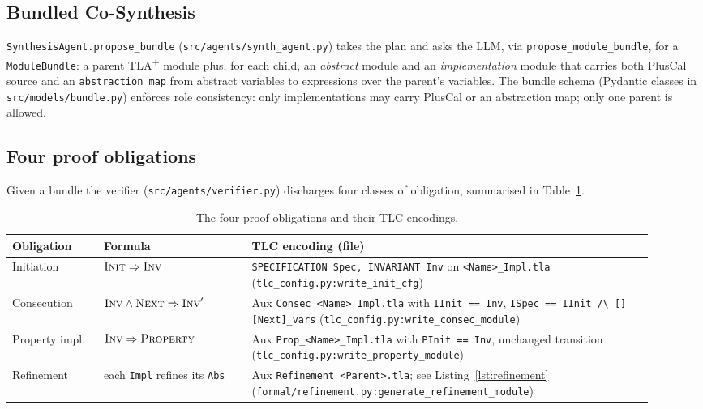 \documentclass[11pt]{article}
\newcommand{\impl}{\Rightarrow}
\newcommand{\TLA}{TLA\textsuperscript{+}}
\newcommand{\nxt}{\textsc{Next}}
\newcommand{\inv}{\textsc{Inv}}
\newcommand{\initp}{\textsc{Init}}
\newcommand{\prop}{\textsc{Property}}
\begin{document}
\subsection{Bundled Co-Synthesis}
\texttt{SynthesisAgent.propose\_bundle} (\texttt{src/agents/synth\_agent.py})
takes the plan and asks the LLM, via \texttt{propose\_module\_bundle}, for a
\texttt{ModuleBundle}: a parent \TLA{} module plus, for each child, an
\emph{abstract} module and an \emph{implementation} module that carries
both PlusCal source and an \texttt{abstraction\_map} from abstract variables
to expressions over the parent's variables. The bundle schema (Pydantic
classes in \texttt{src/models/bundle.py}) enforces role consistency: only
implementations may carry PlusCal or an abstraction map; only one parent is
allowed.

\subsection{Four proof obligations}
Given a bundle the verifier (\texttt{src/agents/verifier.py}) discharges four
classes of obligation, summarised in Table~\ref{tbl:obligations}.

\begin{table}[t]
\centering
\small
\begin{tabular}{p{0.13\linewidth} p{0.21\linewidth} p{0.58\linewidth}}
\toprule
Obligation & Formula & TLC encoding (file) \\
\midrule
Initiation   & $\initp \impl \inv$ &
  \texttt{SPECIFICATION Spec, INVARIANT Inv} on
  \texttt{<Name>\_Impl.tla} (\texttt{tlc\_config.py:write\_init\_cfg}) \\
Consecution  & $\inv \wedge \nxt \impl \inv'$ &
  Aux \texttt{Consec\_<Name>\_Impl.tla} with
  \texttt{IInit == Inv}, \texttt{ISpec == IInit /\textbackslash{}
  [][Next]\_vars} (\texttt{tlc\_config.py:write\_consec\_module}) \\
Property impl. & $\inv \impl \prop$ &
  Aux \texttt{Prop\_<Name>\_Impl.tla} with
  \texttt{PInit == Inv}, unchanged transition
  (\texttt{tlc\_config.py:write\_property\_module}) \\
Refinement   & each \texttt{Impl} refines its \texttt{Abs} &
  Aux \texttt{Refinement\_<Parent>.tla}; see Listing~\ref{lst:refinement}
  (\texttt{formal/refinement.py:generate\_refinement\_module}) \\
\bottomrule
\end{tabular}
\caption{The four proof obligations and their TLC encodings.}
\label{tbl:obligations}
\end{table}
\end{document}
